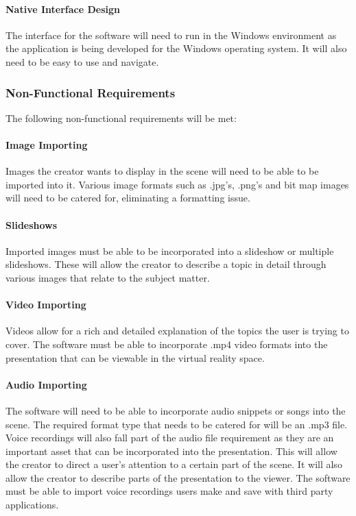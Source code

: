 \documentclass{article}
\begin{document}
		\paragraph{Native Interface Design}

		The interface for the software will need to run in the Windows environment as the application is being developed for the Windows operating system.
		It will also need to be easy to use and navigate.

	\subsubsection{Non-Functional Requirements}

	The following non-functional requirements will be met:

		\paragraph{Image Importing}

		Images the creator wants to display in the scene will need to be able to be imported into it.
		Various image formats such as .jpg's, .png's and bit map images will need to be catered for, eliminating a formatting issue.

		\paragraph{Slideshows}

		Imported images must be able to be incorporated into a slideshow or multiple slideshows.
		These will allow the creator to describe a topic in detail through various images that relate to the subject matter.

		\paragraph{Video Importing}

		Videos allow for a rich and detailed explanation of the topics the user is trying to cover.
		The software must be able to incorporate .mp4 video formats into the presentation that can be viewable in the virtual reality space.

		\paragraph{Audio Importing}

		The software will need to be able to incorporate audio snippets or songs into the scene.
		The required format type that needs to be catered for will be an .mp3 file.
		Voice recordings will also fall part of the audio file requirement as they are an important asset that can be incorporated into the presentation.
		This will allow the creator to direct a user’s attention to a certain part of the scene.
		It will also allow the creator to describe parts of the presentation to the viewer.
		The software must be able to import voice recordings users make and save with third party applications.
\end{document}
